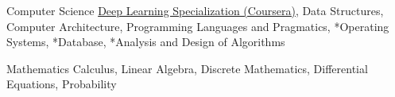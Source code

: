 

\begin{cvskills}

  \cvskill
    {Computer Science} %
    {{\href{https://www.coursera.org/specializations/deep-learning}{Deep Learning Specialization (Coursera)}}, Data Structures, Computer Architecture, Programming Languages \newline and Pragmatics, *Operating Systems, *Database, *Analysis and Design of Algorithms} %


  \cvskill
    {Mathematics} %
    {Calculus, Linear Algebra, Discrete Mathematics, Differential Equations, Probability} %




\end{cvskills}
